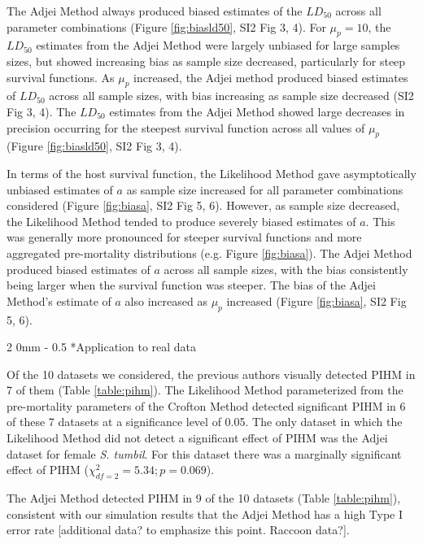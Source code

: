 \documentclass[12pt, a4paper]{article}
\makeatletter
\renewcommand{\subsection}{\@startsection
{subsection}%
{2}%
{0mm}%
{-\baselineskip}%
{0.5\baselineskip}%
{\normalfont\bf}} %
\makeatother
\begin{document}
The Adjei Method
always produced biased estimates of the $LD_{50}$ across all parameter combinations (Figure \ref{fig:biasld50}, SI2 Fig 3, 4).  For $\mu_p = 10$, the $LD_{50}$
estimates from the Adjei Method were largely unbiased for large samples sizes,
but showed increasing bias as sample size decreased, particularly for steep
survival functions.  As $\mu_p$ increased, the Adjei method
produced biased estimates of $LD_{50}$ across all sample sizes, with bias
increasing as sample size decreased (SI2 Fig 3, 4). The $LD_{50}$ estimates from the Adjei
Method showed large decreases in precision occurring
for the steepest survival function across all values of $\mu_p$ (Figure \ref{fig:biasld50}, SI2 Fig 3, 4).

In terms of the host survival function, the Likelihood Method gave
asymptotically unbiased estimates of $a$ as sample size increased for
all parameter combinations considered (Figure \ref{fig:biasa}, SI2 Fig 5, 6).  However, as sample size decreased, the
Likelihood Method tended to produce severely biased estimates of $a$.
This was generally more pronounced for steeper survival functions and more
aggregated pre-mortality distributions (e.g. Figure \ref{fig:biasa}).  The Adjei Method produced
biased estimates of $a$ across all sample sizes, with the bias
consistently being larger when the survival function was steeper. The bias of
the Adjei Method's estimate of $a$ also increased as $\mu_p$ increased (Figure \ref{fig:biasa}, SI2 Fig 5, 6).

\subsection*{Application to real data}

Of the 10 datasets we considered, the previous authors visually detected PIHM
in 7 of them (Table \ref{table:pihm}).  The Likelihood Method parameterized
from the pre-mortality parameters of the Crofton Method detected significant
PIHM in 6 of these 7 datasets at a significance level of 0.05.  The only
dataset in which the Likelihood Method did not detect a significant effect of PIHM was the Adjei dataset
for female \emph{S. tumbil}.  For this dataset there was a marginally significant effect
of PIHM ($\chi^2_{df=2} = 5.34; p = 0.069$).

The Adjei Method detected PIHM in 9 of the 10 datasets (Table \ref{table:pihm}), consistent with our simulation results that the Adjei Method has a high Type I error rate [additional data? to emphasize this point. Raccoon data?].
\end{document}
